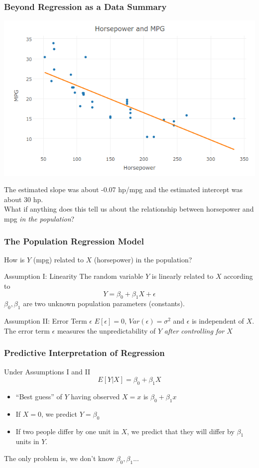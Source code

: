 \documentclass{beamer}
\begin{document}
\begin{frame}
\frametitle{Beyond Regression as a Data Summary}
\begin{center}
\includegraphics[scale = 0.3]{./images/carsFitted2}
\end{center}
The estimated slope was about -0.07 hp/mpg and the estimated intercept was about 30 hp. \\


\alert{What if anything does this tell us about the relationship between horsepower and mpg \emph{in the population}?}
\end{frame}
\begin{frame}
	\frametitle{The Population Regression Model}
	How is $Y$ (mpg) related to $X$ (horsepower) in the population?
	\begin{block}{Assumption I: Linearity}
		The random variable $Y$ is linearly related to $X$ according to 
			$$Y = \beta_0 + \beta_1 X + \epsilon$$
		$\beta_0,\beta_1$ are two unknown population parameters (constants).
	\end{block}

	\begin{block}
		{Assumption II: Error Term $\epsilon$}
		$E[\epsilon]=0$, $Var(\epsilon) = \sigma^2$ and $\epsilon$ is independent of $X$. The error term $\epsilon$ measures the unpredictability of $Y$ \emph{after controlling for $X$}
	\end{block}
\end{frame}
\begin{frame}
	\frametitle{Predictive Interpretation of Regression}
	\begin{block}
		{Under Assumptions I and II}
		$$E[Y|X] = \beta_0 + \beta_1 X$$ 
			\begin{itemize}
				\item ``Best guess'' of $Y$ having observed $X=x$ is $\beta_0 + \beta_1 x$
				\item If $X = 0$, we predict $Y = \beta_0$
				\item If two people differ by one unit in $X$, we predict that they will differ by $\beta_1$ units in $Y$.
			\end{itemize}
	\end{block}
	\alert{The only problem is, we don't know $\beta_0, \beta_1$...}
\end{frame}
\end{document}
